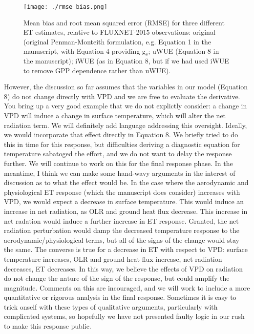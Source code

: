 \documentclass[12pt]{article}
\begin{document}
\begin{figure}[h]
  \centering \texttt{[image: ./rmse\_bias.png]}
  \caption{Mean bias and root mean squared error (RMSE) for three
    different ET estimates, relative to FLUXNET-2015 observations:
    original (original Penman-Monteith formulation, e.g. Equation 1 in
    the manuscript, with Equation 4 providing g$_s$; uWUE (Equation 8
    in the manuscript); iWUE (as in Equation 8, but if we had used
    iWUE to remove GPP dependence rather than uWUE).}
  \label{rmse}
\end{figure}

However, the discussion so far assumes that the variables in our model
(Equation 8) do not change directly with VPD and we are free to
evaluate the derivative. You bring up a very good example that we do
not explictly consider: a change in VPD will induce a change in
surface temperature, which will alter the net radiation term. We will
definitely add language addressing this oversight. Ideally, we would
incorporate that effect directly in Equation 8. We briefly tried to do
this in time for this response, but difficulties deriving a diagnostic
equation for temperature sabatoged the effort, and we do not want to
delay the response further. We will continue to work on this for the
final response phase. In the meantime, I think we can make some
hand-wavy arguments in the interest of discussion as to what the
effect would be. In the case where the aerodynamic and physiological
ET response (which the manuscript does consider) increases with VPD,
we would expect a decrease in surface temperature. This would induce
an increase in net radiation, as OLR and ground heat flux
decrease. This increase in net radation would induce a further
increase in ET response. Granted, the net radiation perturbation would
damp the decreased temperature response to the
aerodynamic/physiological terms, but all of the signs of the change
would stay the same. The converse is true for a decrease in ET with
respect to VPD: surface temperature increases, OLR and ground heat
flux increase, net radiation decreases, ET decreases. In this way, we
believe the effects of VPD on radiation do not change the nature of
the sign of the response, but could amplify the magnitude. Comments on
this are incouraged, and we will work to include a more quantitative or
rigorous analysis in the final response. Sometimes it is easy to trick
onself with these types of qualitative arguments, particularly with
complicated systems, so hopefully we have not presented faulty logic
in our rush to make this response public.
\end{document}
